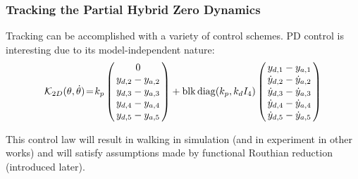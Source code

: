 
\begin{frame}
  \frametitle{Tracking the Partial Hybrid Zero Dynamics}
  Tracking can be accomplished with a variety of control schemes. PD control is interesting due to its model-independent nature:
  \begin{align*}
    \mathcal{K}_{2D}(\theta, \dot{\theta}) \! = \! k_p \left(\!\!
    \begin{array}{c}
      0\\
      y_{d,2} - y_{a,2}\\
      y_{d,3} - y_{a,3}\\
      y_{d,4} - y_{a,4}\\
      y_{d,5} - y_{a,5}
    \end{array}\!\!\right)  + 
    \blkdiag (k_p, k_d I_4)\left(\!\!
    \begin{array}{c}
      y_{d,1} - y_{a,1}\\
      \dot{y}_{d,2} - \dot{y}_{a,2}\\
      \dot{y}_{d,3} - \dot{y}_{a,3}\\
      \dot{y}_{d,4} - \dot{y}_{a,4}\\
      \dot{y}_{d,5} - \dot{y}_{a,5}
    \end{array}\!\!\right)
  \end{align*}

  This control law will result in walking in simulation (and in experiment in other works) and will satisfy assumptions made by functional Routhian reduction (introduced later).
\end{frame}

